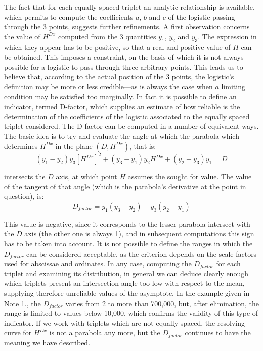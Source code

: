 \documentclass[%
 aip,
 jmp,%
 amsmath,amssymb,
 reprint,%
]{revtex4-1}
\begin{document}
The fact that for each equally spaced triplet an analytic  relationship is available, which permits to compute the coefficients $a$, $b$ and $c$ of the logistic passing through the 3 points, suggests further refinements. A first observation concerns  the value of $H^{Dx}$ computed  from the 3 quantities $y_1$, $y_2$ and $y_3$. The expression in which they appear has to  be positive, so that a real and positive value of $H$ can be obtained. This imposes a constraint, on the  basis of which it is  not always  possible for a logistic to pass through three arbitrary points.
This leads us to believe that, according to the actual position of the 3 points, the logistic's definition may be more or less credible---as is always the  case when $a$ limiting condition may be satisfied too marginally.
In fact it is possible to define an indicator, termed D-factor, which supplies an estimate of how reliable is the determination of the coefficients of the logistic  associated to the  equally spaced triplet considered. The D-factor can be computed in a  number of equivalent ways. The  basic idea is  to try and evaluate the angle at  which the parabola which determines $H^{Dx}$ in the plane $(D, H^{Dx})$, that is:
 \[(y_1 - y_2) y_3 [H^{Dx}]^2 + (y_3 - y_1) y_2 H^{Dx} + (y_2 - y_3) y_1 = D\]

intersects the $D$ axis, at which  point $H$ assumes the sought for value. The value of the tangent of that angle (which is the parabola's derivative at the point in question), is:
	\[D_{factor} = y_1 (y_3 - y_2) - y_3 (y_2 - y_1)\]

This value is negative, since it corresponds to the lesser parabola intersect with the $D$ axis (the other one is always 1), and in subsequent computations this sign has to be taken into account.
It is not possible to define the ranges in which the $D_{factor}$ can be considered acceptable, as the criterion  depends on the scale factors used for abscissae and ordinates.  In any case, computing the $D_{factor}$ for each  triplet and  examining  its distribution, in general we can deduce clearly enough which triplets present an intersection angle too low with respect to the mean, supplying therefore unreliable values of the asymptote.
In the example given in Note 1., the $D_{factor}$ varies from 2 to more than 700,000, but, after elimination, the  range is limited to values below 10,000, which confirms the validity of this type of indicator.
If we work with  triplets which are not equally spaced, the  resolving curve for $H^{Dx}$ is not a parabola any more, but the $D_{factor}$ continues to have the meaning we have described.
\end{document}
